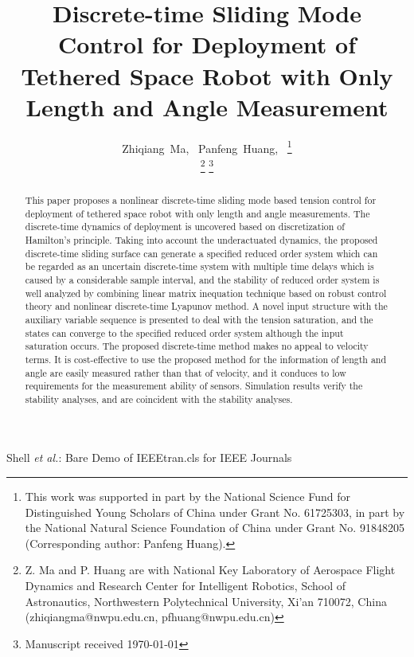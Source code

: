 \documentclass[10pt,onecolumn,draftcls]{IEEEtran}
\begin{document}
\title{Discrete-time Sliding Mode Control for Deployment of Tethered Space Robot with Only Length and Angle Measurement}

\author{Zhiqiang~Ma,~
        Panfeng~Huang,~
\thanks{This work was supported in part by the National Science Fund for Distinguished Young Scholars of China under Grant No. 61725303, in part by the National Natural Science Foundation of China under Grant No. 91848205 (Corresponding
author: Panfeng Huang).}

\thanks{Z. Ma and P. Huang are with National Key Laboratory of Aerospace Flight Dynamics and Research Center for Intelligent Robotics, School of Astronautics, Northwestern Polytechnical University, Xi'an 710072, China (zhiqiangma@nwpu.edu.cn, pfhuang@nwpu.edu.cn)}%
\thanks{Manuscript received \today}
}
%
{Shell \MakeLowercase{\textit{et al.}}: Bare Demo of IEEEtran.cls for IEEE Journals}

\maketitle

\begin{abstract}
This paper proposes a nonlinear discrete-time sliding mode based tension control for deployment of tethered space robot with only length and angle measurements. 
The discrete-time dynamics of deployment is uncovered based on discretization of Hamilton’s principle. Taking into account the underactuated dynamics, the proposed discrete-time sliding surface can generate a specified reduced order  system which can be regarded as an uncertain discrete-time system with multiple time delays which is caused by a considerable sample interval, and the stability of reduced order  system is well analyzed by combining linear matrix inequation technique based on robust control theory and nonlinear discrete-time Lyapunov method. A novel input structure with the auxiliary variable sequence is presented to deal with the tension saturation, and the states can converge to the specified reduced order  system although the input saturation occurs. 
The proposed discrete-time method makes no appeal to velocity terms. It is cost-effective to use the proposed method for  the information of length and angle are easily measured rather than that of velocity, and it conduces to low requirements for the measurement ability of sensors.  
Simulation results verify the stability analyses, and are coincident with the stability analyses.

\end{abstract}
\end{document}
